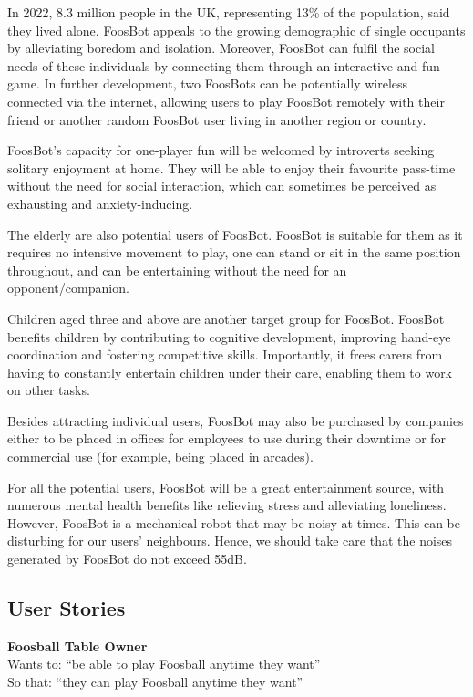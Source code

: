 \documentclass{article}
\begin{document}
In 2022, 8.3 million people in the UK, representing 13\% of the population, said they lived alone\cite{census2021}. FoosBot appeals to the growing demographic of single occupants by alleviating boredom and isolation. Moreover, FoosBot can fulfil the social needs of these individuals by connecting them through an interactive and fun game. In further development, two FoosBots can be potentially wireless connected via the internet, allowing users to play FoosBot remotely with their friend or another random FoosBot user living in another region or country.

FoosBot's capacity for one-player fun will be welcomed by introverts seeking solitary enjoyment at home. They will be able to enjoy their favourite pass-time without the need for social interaction, which can sometimes be perceived as exhausting\cite{helgoe2013introvert} and anxiety-inducing. 

The elderly are also potential users of FoosBot. FoosBot is suitable for them as it requires no intensive movement to play, one can stand or sit in the same position throughout, and can be entertaining without the need for an opponent/companion. 

Children aged three and above are another target group for FoosBot. FoosBot benefits children by contributing to cognitive development\cite{dag2021children}, improving hand-eye coordination\cite{health2023Foosball} and fostering competitive skills. Importantly, it frees carers from having to constantly entertain children under their care, enabling them to work on other tasks. 

Besides attracting individual users, FoosBot may also be purchased by companies either to be placed in offices for employees to use during their downtime or for commercial use (for example, being placed in arcades). 
 
For all the potential users, FoosBot will be a great entertainment source, with numerous mental health benefits like relieving stress and alleviating loneliness. However, FoosBot is a mechanical robot that may be noisy at times. This can be disturbing for our users’ neighbours. Hence, we should take care that the noises generated by FoosBot do not exceed 55dB\cite{king2012noise}. 

\subsection{User Stories}

\textbf{Foosball Table Owner}\\
Wants to:  “be able to play Foosball anytime they want” \\
So that: “they can play Foosball anytime they want”
\end{document}
